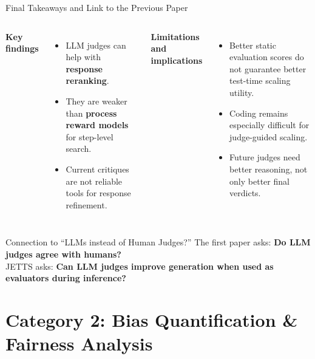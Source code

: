 \documentclass[10pt]{beamer}
\begin{document}
	\begin{frame}{Final Takeaways and Link to the Previous Paper}
		\begin{columns}[T,onlytextwidth]
			\textbf{Key findings}
			\begin{itemize}
				\item LLM judges can help with \textbf{response reranking}.
				\item They are weaker than \textbf{process reward models} for step-level search.
				\item Current critiques are not reliable tools for response refinement.
			\end{itemize}
			
			\textbf{Limitations and implications}
			\begin{itemize}
				\item Better static evaluation scores do not guarantee better test-time scaling utility.
				\item Coding remains especially difficult for judge-guided scaling.
				\item Future judges need better reasoning, not only better final verdicts.
			\end{itemize}
		\end{columns}
		
		\vspace{0.15cm}
		\begin{block}{Connection to ``LLMs instead of Human Judges?''}
			The first paper asks: \textbf{Do LLM judges agree with humans?}\\
			JETTS asks: \textbf{Can LLM judges improve generation when used as evaluators during inference?}
		\end{block}
	\end{frame}
	
	
	
	\section{Category 2: Bias Quantification \& Fairness Analysis}
	
\end{document}
